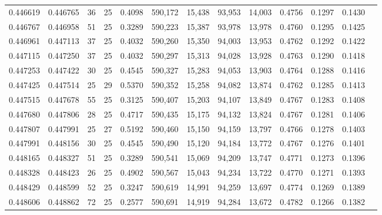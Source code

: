 \begin{tabular}{rrrrrrrrrrrrr}
0.446619 & 0.446765 &    36 &  25 &                                     0.4098 & 590,172 &  15,438 &  93,953 &  14,003 & 0.4756 & 0.1297 & 0.1430 \\
0.446767 & 0.446958 &    51 &  25 &                                     0.3289 & 590,223 &  15,387 &  93,978 &  13,978 & 0.4760 & 0.1295 & 0.1425 \\
0.446961 & 0.447113 &    37 &  25 &                                     0.4032 & 590,260 &  15,350 &  94,003 &  13,953 & 0.4762 & 0.1292 & 0.1422 \\
0.447115 & 0.447250 &    37 &  25 &                                     0.4032 & 590,297 &  15,313 &  94,028 &  13,928 & 0.4763 & 0.1290 & 0.1418 \\
0.447253 & 0.447422 &    30 &  25 &                                     0.4545 & 590,327 &  15,283 &  94,053 &  13,903 & 0.4764 & 0.1288 & 0.1416 \\
0.447425 & 0.447514 &    25 &  29 &                                     0.5370 & 590,352 &  15,258 &  94,082 &  13,874 & 0.4762 & 0.1285 & 0.1413 \\
0.447515 & 0.447678 &    55 &  25 &                                     0.3125 & 590,407 &  15,203 &  94,107 &  13,849 & 0.4767 & 0.1283 & 0.1408 \\
0.447680 & 0.447806 &    28 &  25 &                                     0.4717 & 590,435 &  15,175 &  94,132 &  13,824 & 0.4767 & 0.1281 & 0.1406 \\
0.447807 & 0.447991 &    25 &  27 &                                     0.5192 & 590,460 &  15,150 &  94,159 &  13,797 & 0.4766 & 0.1278 & 0.1403 \\
0.447991 & 0.448156 &    30 &  25 &                                     0.4545 & 590,490 &  15,120 &  94,184 &  13,772 & 0.4767 & 0.1276 & 0.1401 \\
0.448165 & 0.448327 &    51 &  25 &                                     0.3289 & 590,541 &  15,069 &  94,209 &  13,747 & 0.4771 & 0.1273 & 0.1396 \\
0.448328 & 0.448423 &    26 &  25 &                                     0.4902 & 590,567 &  15,043 &  94,234 &  13,722 & 0.4770 & 0.1271 & 0.1393 \\
0.448429 & 0.448599 &    52 &  25 &                                     0.3247 & 590,619 &  14,991 &  94,259 &  13,697 & 0.4774 & 0.1269 & 0.1389 \\
0.448606 & 0.448862 &    72 &  25 &                                     0.2577 & 590,691 &  14,919 &  94,284 &  13,672 & 0.4782 & 0.1266 & 0.1382 \\

\end{tabular}
